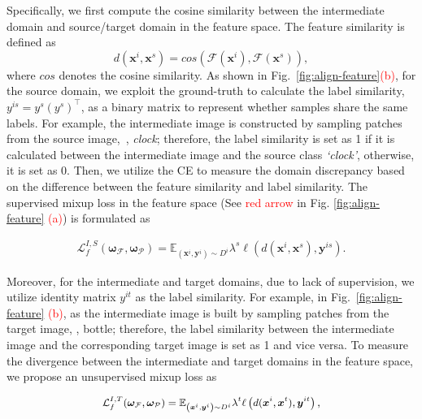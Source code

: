 \documentclass[10pt,twocolumn,letterpaper, ]{article}
\begin{document}
Specifically, we first compute the cosine similarity between the intermediate domain and source/target domain in the feature space. The feature similarity is defined as
{\setlength\abovedisplayskip{3pt}
\setlength\belowdisplayskip{3pt}
\begin{equation}
    d(\boldsymbol{x}^{i}, \boldsymbol{x}^{s}) = cos(\mathcal {F}\left(\boldsymbol{x}^{i}\right), \mathcal {F}\left(\boldsymbol{x}^{s}\right)), \nonumber
\end{equation}}
where $cos$ denotes the cosine similarity. 
As shown in Fig.~\ref{fig:align-feature}\textcolor{red}{(b)}, for the source domain, we exploit the ground-truth to calculate the label similarity, $y^{is} =y^s({y^s})^{\intercal}$, as a binary matrix to represent whether samples share the same labels. For example, the intermediate image is constructed by sampling patches from the source image,~\eg, \textit{clock}; therefore, the label similarity is set as 1 if it is calculated between the intermediate image and the source class \textit{`clock'}, otherwise, it is set as 0.
Then, we utilize the CE to measure the domain discrepancy based on the difference between the feature similarity and label similarity. The supervised mixup loss in the feature space (See \textcolor{red}{red arrow} in Fig. \ref{fig:align-feature} \textcolor{red}{(a)}) is formulated as
{\setlength\abovedisplayskip{3pt}
\setlength\belowdisplayskip{3pt}
\begin{small}
\begin{equation}
    \begin{aligned}
    \mathcal{L}_{f}^{I,S}(\boldsymbol{\omega}_{\mathcal{F}}, \boldsymbol{\omega}_{\mathcal{P}}) = \mathbb{E}_{\left(\boldsymbol{x}^{i}, \boldsymbol{y}^{i}\right) \sim D^{i}} \lambda^{s}\ell\left(d(\boldsymbol{x}^{i},\boldsymbol{x}^{s}), \boldsymbol{y}^{is}\right). \nonumber
    \end{aligned}
\end{equation}
\end{small}
}
Moreover, for the intermediate and target domains, due to lack of supervision, we utilize identity matrix $y^{it}$ as the label similarity. For example, in Fig.~\ref{fig:align-feature} \textcolor{red}{(b)}, as the intermediate image is built by sampling patches from the target image, \eg, bottle; therefore, the label similarity between the intermediate image and the corresponding target image is set as 1 and vice versa. 
To measure the divergence between the intermediate and target domains in the feature space, we propose an unsupervised mixup loss as
{\setlength\abovedisplayskip{3pt}
\setlength\belowdisplayskip{3pt}
\begin{small}
\begin{equation}
\small
    \begin{aligned}
   \mathcal{L}_{f}^{I,T}(\boldsymbol{\omega}_{\mathcal{F}}, \boldsymbol{\omega}_{\mathcal{P}}) = \mathbb{E}_{\left(\boldsymbol{x}^{i}, \boldsymbol{y}^{i}\right) \sim D^{i}} \lambda^{t}\ell\left(d(\boldsymbol{x}^{i}, \boldsymbol{x}^{t}), \boldsymbol{y}^{it}\right), \nonumber
    \end{aligned}
\end{equation}
\end{small}}
\end{document}
